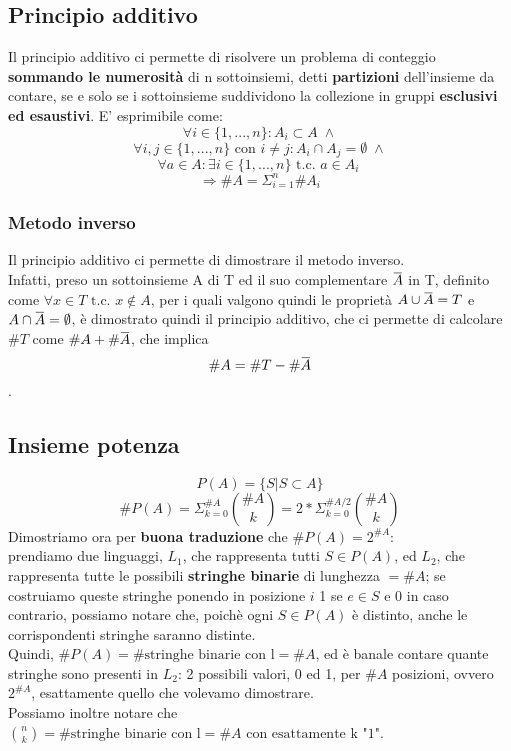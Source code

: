 \documentclass{report}
\newcommand{\overbar}[1]{\mkern 1.5mu\overline{\mkern-1.5mu#1\mkern-1.5mu}\mkern 1.5mu}
\begin{document}
    \subsection{Principio additivo}
        Il principio additivo ci permette di risolvere un problema di conteggio
        \textbf{sommando le numerosità} di n sottoinsiemi, detti \textbf{partizioni} dell'insieme da contare,
        se e solo se i sottoinsieme suddividono la collezione in gruppi \textbf{esclusivi ed esaustivi}.
        E' esprimibile come:
        $$ \forall i \in \{1, ..., n\}: A_i \subset A \; \wedge $$
        $$ \forall i,j \in \{1, ..., n\} \textrm{ con } i \neq j: A_i \cap A_j = \emptyset \; \wedge $$
        $$ \forall a \in A: \exists i \in \{1, ..., n\} \textrm{ t.c. } a \in A_i \ $$
        $$ \Longrightarrow \#A = \Sigma_{i=1}^{n} \#A_i $$
        \subsubsection{Metodo inverso}
            Il principio additivo ci permette di dimostrare il metodo inverso. \\
            Infatti, preso un sottoinsieme A di T ed il suo complementare $\overbar{A}$ in T, definito come
            $\forall x \in T \textrm{ t.c. } x \notin A$, per i quali valgono quindi le proprietà
            $A \cup \overbar{A} = T$ e $A \cap \overbar{A} = \emptyset$, è dimostrato quindi 
            il principio additivo, che ci permette di calcolare $\#T$ come $\#A + \#\overbar{A}$, che implica
            $$\#A = \#T - \#\overbar{A}$$.
    \subsection{Insieme potenza}
        $$P(A) = \{S | S \subset A\}$$
        $$\#P(A) = \Sigma_{k=0}^{\#A}\binom{\#A}{k} = 2*\Sigma_{k=0}^{\#A/2}\binom{\#A}{k}$$
        Dimostriamo ora per \textbf{buona traduzione} che $\#P(A) = 2^{\#A}$: \\
        prendiamo due linguaggi, $L_1$, che rappresenta tutti $S \in P(A)$, ed
        $L_2$, che rappresenta tutte le possibili \textbf{stringhe binarie} di 
        lunghezza $ = \#A$; se costruiamo queste stringhe ponendo in posizione
        $i$ 1 se $e \in S$ e 0 in caso contrario, possiamo notare che, poichè
        ogni $S \in P(A)$ è distinto, anche le corrispondenti stringhe saranno distinte. \\
        Quindi, $\#P(A) = \#\textrm{stringhe binarie con l} = \#A$, ed è banale contare 
        quante stringhe sono presenti in $L_2$: 2 possibili valori, 0 ed 1, per $\#A$
        posizioni, ovvero $2^{\#A}$, esattamente quello che volevamo dimostrare. \\
        Possiamo inoltre notare che $\binom{n}{k} = \#\textrm{stringhe binarie con l} = \#A
        \textrm{ con esattamente k "1"}$.
\end{document}
